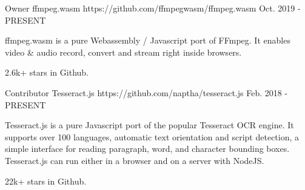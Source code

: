 

\begin{cventries}

  \cventry
    {Owner} %
    {ffmpeg.wasm} %
    {https://github.com/ffmpegwasm/ffmpeg.wasm} %
    {Oct. 2019 - PRESENT} %
    {
      \begin{cvitems} %
        \item {ffmpeg.wasm is a pure Webassembly / Javascript port of FFmpeg. It enables video \& audio record, convert and stream right inside browsers.}
        \item {2.6k+ stars in Github.}
      \end{cvitems}
    }

  \cventry
    {Contributor} %
    {Tesseract.js} %
    {https://github.com/naptha/tesseract.js} %
    {Feb. 2018 - PRESENT} %
    {
      \begin{cvitems} %
        \item {Tesseract.js is a pure Javascript port of the popular Tesseract OCR engine. It supports over 100 languages, automatic text orientation and script detection, a simple interface for reading paragraph, word, and character bounding boxes. Tesseract.js can run either in a browser and on a server with NodeJS.}
        \item {22k+ stars in Github.}
      \end{cvitems}
    }



\end{cventries}
